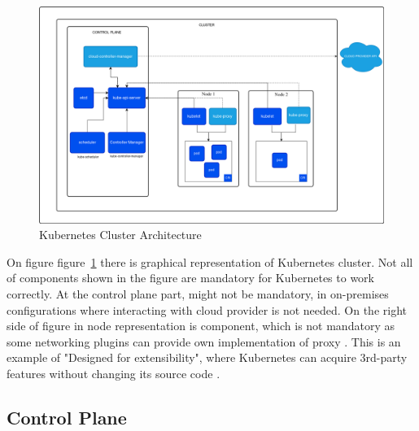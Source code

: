 \begin{figure}[tbh]
    \centering
    \includegraphics[width=1\columnwidth]{images/kubernetes-cluster-architecture.png}
    \caption{Kubernetes Cluster Architecture \cite{KubernetesArch}}
    \label{fig:k8s_arch}
\end{figure}

On figure figure~\ref{fig:k8s_arch} there is graphical representation of Kubernetes cluster. Not all of components shown in the figure are mandatory for Kubernetes to work correctly. At the control plane part, \textit{} might not be mandatory, in on-premises configurations where interacting with cloud provider is not needed. On the right side of figure in node representation is \textit{} component, which is not mandatory as some networking plugins can provide own implementation of proxy \cite{KubernetesArch}. This is an example of "Designed for extensibility", where Kubernetes can acquire 3rd-party features without changing its source code \cite{KubernetesDocs}.

%     






\subsection{Control Plane}
\label{sec:k8s_cplane}

